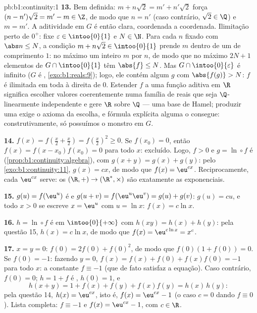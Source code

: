 \begin{solution}{pb:b1:continuity:1}
\textbf{13.} Bem definida: $m + n\sqrt2 = m' + n'\sqrt2$ força
$(n - n')\sqrt2 = m' - m \in \Z$, de modo que $n = n'$ (caso contrário, $\sqrt2 \in
\Q$) e $m = m'$. A aditividade em $G$ é então clara, coordenada a
coordenada. Ilimitação perto de $0^+$: fixe $\varepsilon \in
\intoo{0}{1}$ e $N \in \N$. Para cada $n$ fixado com $\abs n
\leq N$, a condição $m + n\sqrt2 \in \intoo{0}{1}$ prende $m$
dentro de um  de comprimento $1$: no máximo um inteiro $m$ por
$n$, de modo que no máximo $2N + 1$ elementos de $G \cap \intoo{0}{1}$ têm
$\abs{f} \leq N$. Mas $G \cap \intoo{0}{\varepsilon}$ é
infinito ($G$ é , \cref{exo:b1:reals:9}); logo, ele
contém algum $g$ com $\abs{f(g)} > N$: $f$ é ilimitada em
toda  à direita de $0$. Estender $f$ a uma função aditiva
em $\R$ significa escolher valores coerentemente numa família de
reais que seja $\Q$-linearmente independente e gere $\R$ sobre $\Q$
--- uma base de Hamel; produzir uma exige o axioma da escolha,
e fórmula explícita alguma o consegue: construtivamente, só possuímos
o monstro em $G$.

\textbf{14.} $f(x) = f(\frac x2 + \frac x2) = f(\frac x2)^2 \geq
0$. Se $f(x_0) = 0$, então $f(x) = f(x - x_0)f(x_0) = 0$ para todo
$x$: excluído. Logo, $f > 0$ e $g = \ln \circ f$ é 
(\cref{prop:b1:continuity:algebra}), com $g(x + y) = g(x) +
g(y)$: pelo \cref{exo:b1:continuity:11}, $g(x) = cx$, de modo que $f(x) =
\eu^{cx}$. Reciprocamente, cada $\eu^{cx}$ serve: os
  $(\R, +) \to (\R^*, \times)$ são exatamente as
exponenciais.

\textbf{15.} $g(u) = f(\eu^u)$ é  e $g(u + v) =
f(\eu^u \eu^v) = g(u) + g(v)$: $g(u) = cu$, e todo $x > 0$
se escreve $x = \eu^u$ com $u = \ln x$: $f(x) = c\ln x$.

\textbf{16.} $h = \ln \circ f$ é  em
$\intoo{0}{+\infty}$ com $h(xy) = h(x) + h(y)$: pela questão 15,
$h(x) = c\ln x$, de modo que $f(x) = \eu^{c\ln x} = x^c$.

\textbf{17.} $x = y = 0$: $f(0) = 2f(0) + f(0)^2$, de modo que $f(0)(1 +
f(0)) = 0$. Se $f(0) = -1$: fazendo $y = 0$, $f(x) = f(x) +
f(0) + f(x)f(0) = -1$ para todo $x$: a constante $f \equiv -1$
(que de fato satisfaz a equação). Caso contrário, $f(0) = 0$; $h
= 1 + f$ é , $h(0) = 1$, e
\[
h(x + y) = 1 + f(x) + f(y) + f(x)f(y) = h(x)\,h(y) :
\]
pela questão 14, $h(x) = \eu^{cx}$, isto é, $f(x) = \eu^{cx} - 1$
(o caso $c = 0$ dando $f \equiv 0$). Lista completa: $f
\equiv -1$ e $f(x) = \eu^{cx} - 1$, com $c \in \R$.


\end{solution}
